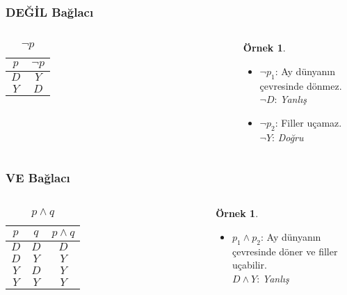 \documentclass[dvipsnames]{beamer}
\theoremstyle{definition}
\theoremstyle{example}
\newtheorem{ornek}[theorem]{Örnek}
\theoremstyle{plain}
\begin{document}
\begin{frame}
  \frametitle{DEĞİL Bağlacı}

  \begin{columns}
    \begin{table}
      \caption{$\neg p$}
      \begin{tabular}{|c||c|}\hline
        $p$ & $\neg p$\\\hline\hline
        $D$ & $Y$     \\\hline
        $Y$ & $D$     \\\hline
      \end{tabular}
    \end{table}

    \pause
    \begin{ornek}
      \begin{itemize}
        \item $\neg p_1$: Ay dünyanın çevresinde dönmez.\\
          $\neg D$: \emph{Yanlış}
        \item $\neg p_2$: Filler uçamaz.\\
          $\neg Y$: \emph{Doğru}
      \end{itemize}
    \end{ornek}
  \end{columns}
\end{frame}

\begin{frame}
  \frametitle{VE Bağlacı}

  \begin{columns}
    \begin{table}
      \caption{$p \wedge q$}
      \begin{tabular}{|c|c||c|}\hline
        $p$ & $q$ & $p \wedge q$\\\hline\hline
        $D$ & $D$ & $D$         \\\hline
        $D$ & $Y$ & $Y$         \\\hline
        $Y$ & $D$ & $Y$         \\\hline
        $Y$ & $Y$ & $Y$         \\\hline
      \end{tabular}
    \end{table}

    \pause
    \begin{ornek}
      \begin{itemize}
        \item $p_1 \wedge p_2$: Ay dünyanın çevresinde döner ve filler
          uçabilir.\\
          $D \wedge Y$: \emph{Yanlış}
      \end{itemize}
    \end{ornek}
  \end{columns}
\end{frame}
\end{document}
